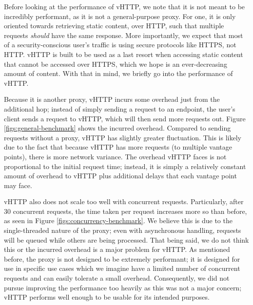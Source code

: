 Before looking at the performance of vHTTP, we note that it is not meant to be
incredibly performant, as it is not a general-purpose proxy. For one, it is
only oriented towards retrieving static content, over HTTP, such that multiple
requests \emph{should} have the same response. More importantly, we expect that
most of a security-conscious user's traffic is using secure protocols like
HTTPS, not HTTP. vHTTP is built to be used as a last resort when accessing
static content that cannot be accessed over HTTPS, which we hope is an
ever-decreasing amount of content. With that in mind, we briefly go into the
performance of vHTTP.

Because it is another proxy, vHTTP incurs some overhead just from the
additional hop; instead of simply sending a request to an endpoint, the user's
client sends a request to vHTTP, which will then send more requests out.
Figure \ref{figs:general-benchmark} shows the incurred overhead. Compared to
sending requests without a proxy, vHTTP has slightly greater fluctuation. This
is likely due to the fact that because vHTTP has more requests (to multiple
vantage points), there is more network variance. The overhead vHTTP faces is
not proportional to the initial request time; instead, it is simply a
relatively constant amount of overhead to vHTTP plus additional delays that
each vantage point may face.

vHTTP also does not scale too well with concurrent requests. Particularly,
after 30 concurrent requests, the time taken per request increases more so
than before, as seen in Figure \ref{figs:concurrency-benchmark}. We believe
this is due to the single-threaded nature of the proxy; even with asynchronous
handling, requests will be queued while others are being processed. That being
said, we do not think this or the incurred overhead is a major problem for
vHTTP. As mentioned before, the proxy is not designed to be extremely
performant; it is designed for use in specific use cases which we imagine have
a limited number of concurrent requests and can easily tolerate a small
overhead. Consequently, we did not pursue improving the performance too heavily
as this was not a major concern; vHTTP performs well enough to be usable for
its intended purposes.



